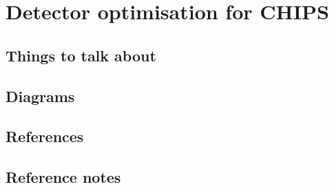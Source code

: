 \chapter{Detector optimisation for CHIPS}
\label{chap:optimisation}


\section{Things to talk about}


\section{Diagrams}


\section{References}


\section{Reference notes}